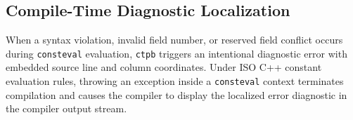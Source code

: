 \subsection{Compile-Time Diagnostic Localization}
When a syntax violation, invalid field number, or reserved field conflict occurs during \texttt{consteval} evaluation, \texttt{ctpb} triggers an intentional diagnostic error with embedded source line and column coordinates. Under ISO C++ constant evaluation rules, throwing an exception inside a \texttt{consteval} context terminates compilation and causes the compiler to display the localized error diagnostic in the compiler output stream.
